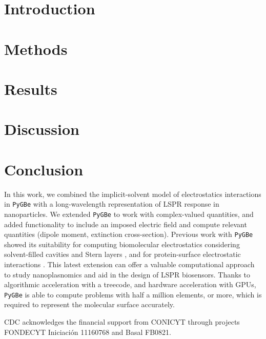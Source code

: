 \documentclass[pre,twocolumn,superscriptaddress]{revtex4}
\newcommand{\pygbe}{\texttt{PyGBe}\xspace}
\begin{document}
\maketitle


\section{Introduction} \label{sec:intro}


\section{Methods}\label{sec:methods}
 

\section{Results} \label{sec:results}


\section{Discussion} \label{sec:discussion}


\section{Conclusion}
%

In this work, we combined the implicit-solvent model of electrostatics interactions in \pygbe 
with a long-wavelength representation of LSPR response in nanoparticles. 
We extended \pygbe to work with complex-valued quantities, and added functionality to 
include an imposed electric field and compute relevant quantities 
(dipole moment, extinction cross-section). 
Previous work with \pygbe showed its suitability for computing 
biomolecular electrostatics considering solvent-filled cavities and Stern layers \cite{CooperBardhanBarba2013}, 
and for protein-surface electrostatic interactions \cite{CooperBarba2016}.
This latest extension can offer a valuable computational approach to study nanoplasnomics and aid in the design of LSPR biosensors. 
Thanks to algorithmic acceleration with a treecode, and hardware acceleration with GPUs, \pygbe is able to compute problems with half a million elements, or more, which is required to represent the molecular surface accurately.



\begin{acknowledgments}

CDC acknowledges the financial support from CONICYT through projects FONDECYT Iniciaci\'on 11160768 and Basal FB0821.
\end{acknowledgments}

\end{document}
